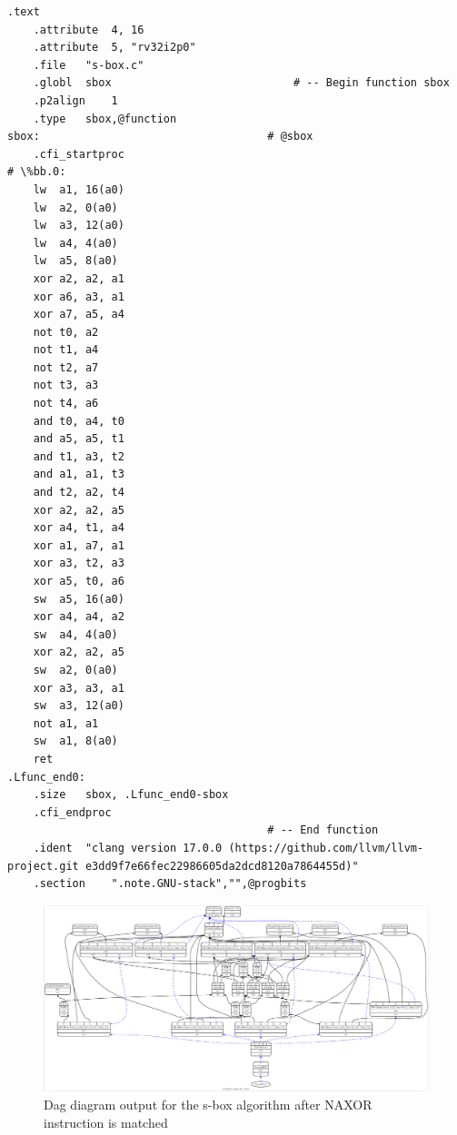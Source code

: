 \begin{lstlisting}[caption= Assembly output without NAXOR instruction]
    .text
	.attribute	4, 16
	.attribute	5, "rv32i2p0"
	.file	"s-box.c"
	.globl	sbox                            # -- Begin function sbox
	.p2align	1
	.type	sbox,@function
sbox:                                   # @sbox
	.cfi_startproc
# \%bb.0:
	lw	a1, 16(a0)
	lw	a2, 0(a0)
	lw	a3, 12(a0)
	lw	a4, 4(a0)
	lw	a5, 8(a0)
	xor	a2, a2, a1
	xor	a6, a3, a1
	xor	a7, a5, a4
	not	t0, a2
	not	t1, a4
	not	t2, a7
	not	t3, a3
	not	t4, a6
	and	t0, a4, t0
	and	a5, a5, t1
	and	t1, a3, t2
	and	a1, a1, t3
	and	t2, a2, t4
	xor	a2, a2, a5
	xor	a4, t1, a4
	xor	a1, a7, a1
	xor	a3, t2, a3
	xor	a5, t0, a6
	sw	a5, 16(a0)
	xor	a4, a4, a2
	sw	a4, 4(a0)
	xor	a2, a2, a5
	sw	a2, 0(a0)
	xor	a3, a3, a1
	sw	a3, 12(a0)
	not	a1, a1
	sw	a1, 8(a0)
	ret
.Lfunc_end0:
	.size	sbox, .Lfunc_end0-sbox
	.cfi_endproc
                                        # -- End function
	.ident	"clang version 17.0.0 (https://github.com/llvm/llvm-project.git e3dd9f7e66fec22986605da2dcd8120a7864455d)"
	.section	".note.GNU-stack","",@progbits

\end{lstlisting}


\begin{figure}
    \centering
    \includegraphics[scale=0.19]{adding_new_instr/naxor_match.png}
    \caption{Dag diagram output for the s-box algorithm after NAXOR instruction is matched}
    \label{fig:naxor_match_diagram}
\end{figure}


